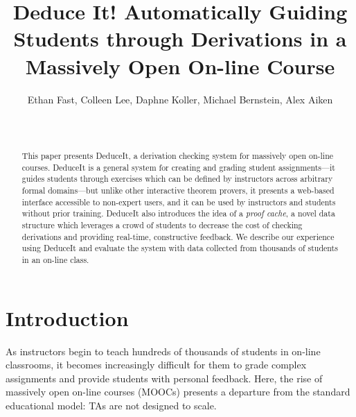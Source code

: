 \documentclass{sigchi}
\begin{document}
\title{Deduce It! Automatically Guiding Students through Derivations in a Massively Open On-line Course}

\author{
  \alignauthor Ethan Fast, Colleen Lee, Daphne Koller, Michael Bernstein, Alex Aiken\\
    \\
    \\
}

\maketitle

\begin{abstract}
This paper presents DeduceIt, a derivation checking system for massively open on-line courses. DeduceIt is a general system for creating and grading student assignments---it guides students through exercises which can be defined by instructors across arbitrary formal domains---but unlike other interactive theorem provers, it presents a web-based interface accessible to non-expert users, and it can be used by instructors and students without prior training. DeduceIt also introduces the idea of a \textit{proof cache}, a novel data structure which leverages a crowd of students to decrease the cost of checking derivations and providing real-time, constructive feedback. We describe our experience using DeduceIt and evaluate the system with data collected from thousands of students in an on-line class.
\end{abstract}

\keywords{
	\textcolor{red}{What keywords to use?}
}





\section{Introduction}
As instructors begin to teach hundreds of thousands of students in on-line classrooms, it becomes increasingly difficult for them to grade complex assignments and provide students with personal feedback. Here, the rise of massively open on-line courses (MOOCs) presents a departure from the standard educational model: TAs are not designed to scale. 
\end{document}
